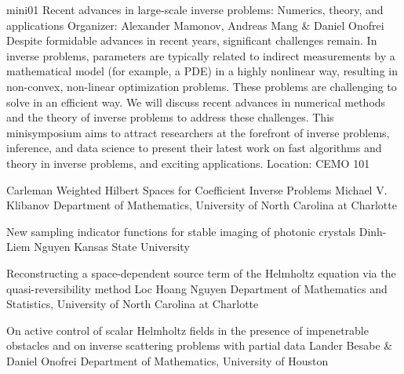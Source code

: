 \mini
{mini01}
{Recent advances in large-scale inverse problems: Numerics, theory, and applications}
{Organizer: Alexander Mamonov, Andreas Mang \& Daniel Onofrei}
{Despite formidable advances in recent years, significant challenges remain. In inverse problems, parameters are typically related to indirect measurements by a mathematical model (for example, a PDE) in a highly nonlinear way, resulting in non-convex, non-linear optimization problems. These problems are challenging to solve in an efficient way. We will discuss recent advances in numerical methods and the theory of inverse problems to address these challenges. This minisymposium aims to attract researchers at the forefront of inverse problems, inference, and data science to present their latest work on fast algorithms and theory in inverse problems, and exciting applications.}
{Location: CEMO 101}


\begin{talks}
\item\talk
{Carleman Weighted Hilbert Spaces for Coefficient Inverse Problems}
{Michael V. Klibanov}
{Department of Mathematics, University of North Carolina at Charlotte}
\item\talk
{New sampling indicator functions for stable imaging of photonic crystals}
{Dinh-Liem Nguyen}
{Kansas State University}
\item\talk
{Reconstructing a space-dependent source term of the Helmholtz equation via the quasi-reversibility method}
{Loc Hoang Nguyen}
{Department of Mathematics and Statistics, University of North Carolina at Charlotte}
\item\talk
{On active control of scalar Helmholtz fields in the presence of impenetrable obstacles and on inverse scattering problems with partial data}
{Lander Besabe \& Daniel Onofrei}
{Department of Mathematics, University of Houston}
\end{talks}
\room

